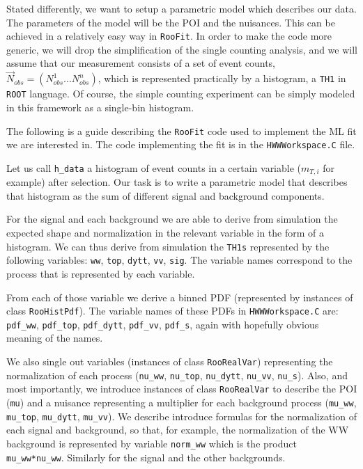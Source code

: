 \documentclass[a4paper,12pt]{article}
\begin{document}
Stated differently, we want to setup a parametric model which describes our
data. The parameters of the model will be the POI and the nuisances. This can
be achieved in a relatively easy way in \verb+RooFit+. In order to make the
code more generic, we will drop the simplification of the single counting
analysis, and we will assume that our measurement consists of a set of event counts,
$\vec{N}_{obs}=(N_{obs}^1...N_{obs}^n)$, which is represented practically by a
histogram, a \verb+TH1+ in \verb+ROOT+ language. Of course, the simple
counting experiment can be simply modeled in this framework as a single-bin
histogram.

The following is a guide describing the \verb+RooFit+ code used to implement the ML
fit we are interested in. The code implementing the fit is in the
\verb+HWWWorkspace.C+ file.

Let us call \verb+h_data+ a histogram of event counts in a certain variable
($m_{T,i}$ for example) after selection. Our task is to write a parametric
model that describes that histogram as the sum of different signal and
background components. 

For the signal and each background we are able to derive from simulation the
expected shape and normalization in the relevant variable in the form of a
histogram. We can thus derive
from simulation the \verb+TH1s+ represented by the following variables:
\verb+ww+, \verb+top+, \verb+dytt+, \verb+vv+, \verb+sig+. The variable names
correspond to the process that is represented by each variable.

From each of those variable we derive a binned PDF (represented by instances
of class \verb+RooHistPdf+). The variable names of these PDFs in
\verb+HWWWorkspace.C+ are: \verb+pdf_ww+, \verb+pdf_top+, \verb+pdf_dytt+,
\verb+pdf_vv+, \verb+pdf_s+, again with hopefully obvious meaning of the
names.

We also single out variables (instances of class \verb+RooRealVar+)
representing the normalization of each process (\verb+nu_ww+, \verb+nu_top+,
\verb+nu_dytt+, \verb+nu_vv+, \verb+nu_s+).
Also, and most importantly, we introduce instances of class \verb+RooRealVar+
to describe the POI (\verb+mu+) and a nuisance representing a multiplier for
each background process (\verb+mu_ww+, \verb+mu_top+,
\verb+mu_dytt+, \verb+mu_vv+).
We describe introduce formulas for the normalization of each signal and
background, so that, for example, the normalization of the WW background is
represented by variable \verb+norm_ww+ which is the product
\verb+mu_ww*nu_ww+. Similarly for the signal and the other backgrounds.
\end{document}
